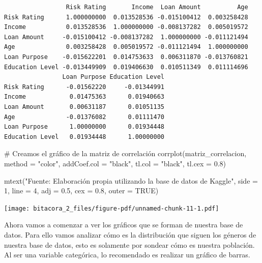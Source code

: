 \documentclass[
  letterpaper,
  DIV=11,
  numbers=noendperiod]{scrreprt}
\newenvironment{Shaded}{\begin{snugshade}}{\end{snugshade}}
\newcommand{\AttributeTok}[1]{\textcolor[rgb]{0.40,0.45,0.13}{#1}}
\newcommand{\CommentTok}[1]{\textcolor[rgb]{0.37,0.37,0.37}{#1}}
\newcommand{\ConstantTok}[1]{\textcolor[rgb]{0.56,0.35,0.01}{#1}}
\newcommand{\DecValTok}[1]{\textcolor[rgb]{0.68,0.00,0.00}{#1}}
\newcommand{\FloatTok}[1]{\textcolor[rgb]{0.68,0.00,0.00}{#1}}
\newcommand{\FunctionTok}[1]{\textcolor[rgb]{0.28,0.35,0.67}{#1}}
\newcommand{\NormalTok}[1]{\textcolor[rgb]{0.00,0.23,0.31}{#1}}
\newcommand{\StringTok}[1]{\textcolor[rgb]{0.13,0.47,0.30}{#1}}
\begin{document}
\begin{verbatim}
                 Risk Rating       Income  Loan Amount          Age
Risk Rating      1.000000000  0.013528536 -0.015100412  0.003258428
Income           0.013528536  1.000000000 -0.008137282  0.005019572
Loan Amount     -0.015100412 -0.008137282  1.000000000 -0.011121494
Age              0.003258428  0.005019572 -0.011121494  1.000000000
Loan Purpose    -0.015622201  0.014753633  0.006311870 -0.013760821
Education Level -0.013449909  0.019406630  0.010511349  0.011114696
                Loan Purpose Education Level
Risk Rating      -0.01562220     -0.01344991
Income            0.01475363      0.01940663
Loan Amount       0.00631187      0.01051135
Age              -0.01376082      0.01111470
Loan Purpose      1.00000000      0.01934448
Education Level   0.01934448      1.00000000
\end{verbatim}

\begin{Shaded}
\begin{Highlighting}[]
\CommentTok{\# Creamos el gráfico de la matriz de correlación}
\FunctionTok{corrplot}\NormalTok{(matriz\_correlacion, }\AttributeTok{method =} \StringTok{"color"}\NormalTok{, }\AttributeTok{addCoef.col =} \StringTok{"black"}\NormalTok{, }\AttributeTok{tl.col =} \StringTok{"black"}\NormalTok{, }\AttributeTok{tl.cex =} \FloatTok{0.8}\NormalTok{)}

\FunctionTok{mtext}\NormalTok{(}\StringTok{"Fuente: Elaboración propia utilizando la base de datos de Kaggle"}\NormalTok{, }\AttributeTok{side =} \DecValTok{1}\NormalTok{, }\AttributeTok{line =} \DecValTok{4}\NormalTok{, }\AttributeTok{adj =} \FloatTok{0.5}\NormalTok{, }\AttributeTok{cex =} \FloatTok{0.8}\NormalTok{, }\AttributeTok{outer =} \ConstantTok{TRUE}\NormalTok{)}
\end{Highlighting}
\end{Shaded}

\texttt{[image: bitacora\_2\_files/figure-pdf/unnamed-chunk-11-1.pdf]}

Ahora vamos a comenzar a ver los gráficos que se forman de nuestra base
de datos. Para ello vamos analizar cómo es la distribución que siguen
los géneros de nuestra base de datos, esto es solamente por sondear cómo
es nuestra población. Al ser una variable categórica, lo recomendado es
realizar un gráfico de barras.
\end{document}

